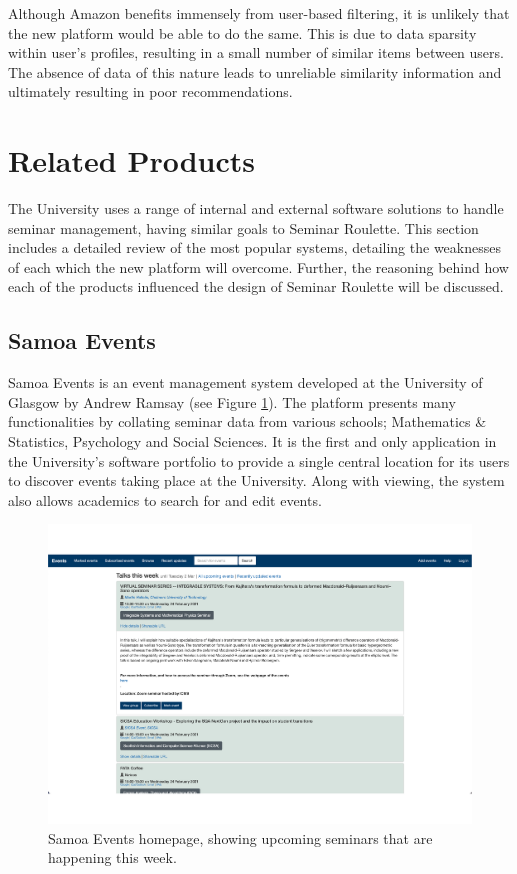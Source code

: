 \documentclass{l4proj}
\begin{document}
Although Amazon benefits immensely from user-based filtering, it is unlikely that the new platform would be able to do the same. This is due to data sparsity within user's profiles, resulting in a small number of similar items between users. The absence of data of this nature leads to unreliable similarity information and ultimately resulting in poor recommendations.

\section{Related Products}

The University uses a range of internal and external software solutions to handle seminar management, having similar goals to Seminar Roulette. This section includes a detailed review of the most popular systems, detailing the weaknesses of each which the new platform will overcome. Further, the reasoning behind how each of the products influenced the design of Seminar Roulette will be discussed.

\subsection{Samoa Events}
\label{section:samoa}

Samoa Events \citep{samoa} is an event management system developed at the University of Glasgow by Andrew Ramsay (see Figure \ref{fig:samoa}). The platform presents many functionalities by collating seminar data from various schools; Mathematics \& Statistics, Psychology and Social Sciences. It is the first and only application in the University's software portfolio to provide a single central location for its users to discover events taking place at the University. Along with viewing, the system also allows academics to search for and edit events.

\begin{figure}[htb]
    \centering
    \includegraphics[width=0.8\linewidth]{images/samoa_events.pdf}    
    \caption{Samoa Events homepage, showing upcoming seminars that are happening this week.}
    \label{fig:samoa} 
\end{figure}
\end{document}
